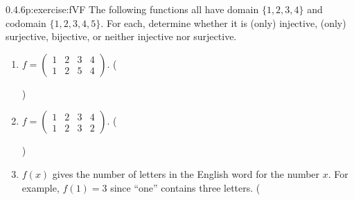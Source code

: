 \documentclass[twoside,11pt,]{book}
\numberwithin{equation}{chapter}
\newcommand{\twoline}[2]{\begin{pmatrix}#1 \\ #2 \end{pmatrix}}
\newcommand{\amp}{&}
\begin{document}
\begin{divisionsolution}{0.4.6}{}{p:exercise:fVF}%
The following functions all have domain \(\{1,2,3,4\}\) and codomain \(\{1,2,3,4,5\}\text{.}\) For each, determine whether it is (only) injective, (only) surjective, bijective, or neither injective nor surjective.%
\begin{enumerate}[label=(\alph*)]
\item{}\(f = \twoline{1 \amp 2 \amp 3 \amp 4}{1 \amp 2 \amp 5 \amp 4}\text{.}\) \quad()\quad
%
\item{}\(f = \twoline{1 \amp 2 \amp 3 \amp 4}{1 \amp 2 \amp 3 \amp 2}\text{.}\) \quad()\quad
%
\item{}\(f(x)\) gives the number of letters in the English word for the number \(x\text{.}\) For example, \(f(1) = 3\) since ``one'' contains three letters. \quad(
\end{enumerate}
\end{divisionsolution}
\end{document}
